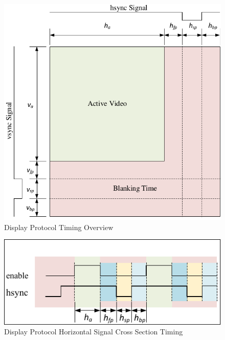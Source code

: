     \begin{figure}[H]
        \centering
        \includegraphics[width=1.0\textwidth]{fig/display_timing_overview.pdf}
        \caption{Display Protocol Timing Overview}
        \label{fig:display_protocol_timing_overview}
    \end{figure}

    \begin{figure}[H]
        \centering
        \includegraphics[width=1.0\textwidth]{fig/display_timing_line_cross.pdf}
        \caption{Display Protocol Horizontal Signal Cross Section Timing}
        \label{fig:display_protocol_line_cross}
    \end{figure}

